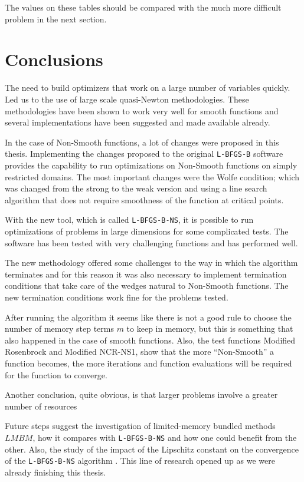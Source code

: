 The values on these tables should be compared with the much more difficult problem in the next section.

\chapter{Conclusions}

The need to build optimizers that work on a large number of variables quickly. Led us to the use of large scale quasi-Newton methodologies. These methodologies have been shown to work very well for smooth functions and several implementations have been suggested and made available already.

In the case of Non-Smooth functions, a lot of changes were proposed in this thesis. Implementing the changes proposed to the original \texttt{L-BFGS-B} software provides the capability to run optimizations on Non-Smooth functions on simply restricted domains. The most important changes were the Wolfe condition; which was changed from the strong to the weak version and using a line search algorithm that does not require smoothness of the function at critical points.

With the new tool, which is called \texttt{L-BFGS-B-NS}, it is possible to run optimizations of problems in large dimensions for some complicated tests. The software has been tested with very challenging functions and has performed well.

The new methodology offered some challenges to the way in which the algorithm terminates and for this reason it was also necessary to implement termination conditions that take care of the wedges natural to Non-Smooth functions. The new termination conditions work fine for the problems tested.

After running the algorithm it seems like there is not a good rule to choose the number of memory step terms $m$ to keep in memory, but this is something that also happened in the case of smooth functions. Also, the test functions Modified Rosenbrock and Modified NCR-NS1, show that the more ``Non-Smooth'' a function becomes, the more iterations and function evaluations will be required for the function to converge.

Another conclusion, quite obvious, is that larger problems involve a greater number of resources

Future steps suggest the investigation of limited-memory bundled methods $LMBM$, how it compares with \texttt{L-BFGS-B-NS} and how one could benefit from the other. Also, the study of the impact of the Lipschitz constant on the convergence of the \texttt{L-BFGS-B-NS} algorithm \citep{QJ:QJ935}. This line of research opened up as we were already finishing this thesis.

